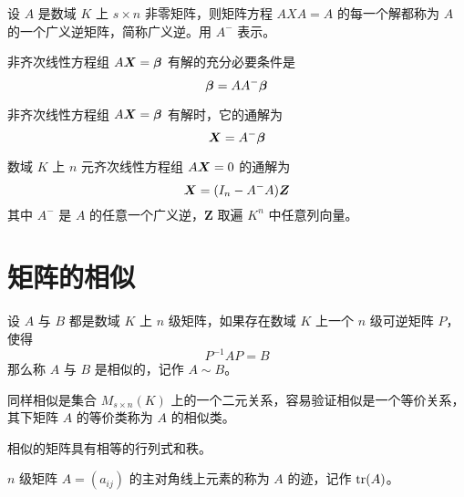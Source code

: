 \begin{definition}
    设 $A$ 是数域 $K$ 上 $s\times n$ 非零矩阵，则矩阵方程 $AXA = A$ 的每一个解都称为 $A$ 的一个广义逆矩阵，简称广义逆。用 $A^-$ 表示。
\end{definition}

\begin{theorem}
    非齐次线性方程组 $A\boldsymbol{X} = \boldsymbol{\beta}$ 有解的充分必要条件是
    $$\boldsymbol{\beta} = AA^-\boldsymbol{\beta}$$
\end{theorem}

\begin{theorem}
    非齐次线性方程组 $A\boldsymbol{X} = \boldsymbol{\beta}$ 有解时，它的通解为
    $$\boldsymbol{X}  = A^-\boldsymbol{\beta}$$
\end{theorem}

\begin{theorem}
    数域 $K$ 上 $n$ 元齐次线性方程组 $A\boldsymbol{X} = 0$ 的通解为
    $$\boldsymbol{X}  = (I_n - A^-A)\boldsymbol{Z}$$
    其中 $A^-$ 是 $A$ 的任意一个广义逆，$\boldsymbol{Z}$ 取遍 $K^n$ 中任意列向量。
\end{theorem}


\section{矩阵的相似}

\begin{definition}
    设 $A$ 与 $B$ 都是数域 $K$ 上 $n$ 级矩阵，如果存在数域 $K$ 上一个 $n$ 级可逆矩阵 $P$，使得
    $$P^{-1}AP = B$$
    那么称 $A$ 与 $B$ 是相似的，记作 $A\sim B$。
\end{definition}

同样相似是集合 $M_{s\times n}(K)$ 上的一个二元关系，容易验证相似是一个等价关系，其下矩阵 $A$ 的等价类称为 $A$ 的相似类。

相似的矩阵具有相等的行列式和秩。

\begin{definition}
    $n$ 级矩阵 $A=(a_{ij})$ 的主对角线上元素的称为 $A$ 的迹，记作 $\operatorname{tr}(A)$。
\end{definition}

